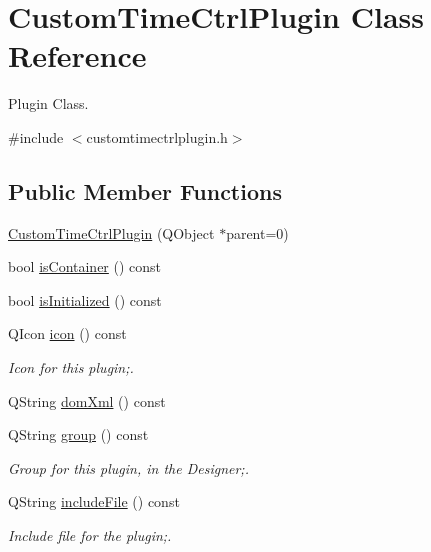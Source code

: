 \hypertarget{class_custom_time_ctrl_plugin}{
\section{CustomTimeCtrlPlugin Class Reference}
\label{class_custom_time_ctrl_plugin}
}


Plugin Class.  




{\ttfamily \#include $<$customtimectrlplugin.h$>$}

\subsection*{Public Member Functions}
\begin{DoxyCompactItemize}
\item 
\hyperlink{class_custom_time_ctrl_plugin_abe7cd3182b486842f7dc7f13a5b4c087}{CustomTimeCtrlPlugin} (QObject $\ast$parent=0)
\item 
bool \hyperlink{class_custom_time_ctrl_plugin_ac3f03f248edec95fb4d8e50596adbcbb}{isContainer} () const 
\item 
bool \hyperlink{class_custom_time_ctrl_plugin_a2064723849d9484c5c84aa7ad901274d}{isInitialized} () const 
\item 
QIcon \hyperlink{class_custom_time_ctrl_plugin_ae0dea4f3f0275ab82f97af2f1cd09e9a}{icon} () const 
\begin{DoxyCompactList}\small\item\em Icon for this plugin;. \item\end{DoxyCompactList}\item 
QString \hyperlink{class_custom_time_ctrl_plugin_a67b84de1996b4765eaaf3bb19ae79a1c}{domXml} () const 
\item 
QString \hyperlink{class_custom_time_ctrl_plugin_a3d53c6dcaf283efd9329d8b248c7d403}{group} () const 
\begin{DoxyCompactList}\small\item\em Group for this plugin, in the Designer;. \item\end{DoxyCompactList}\item 
QString \hyperlink{class_custom_time_ctrl_plugin_a873b662cfddffa85ad084a89091cd587}{includeFile} () const 
\begin{DoxyCompactList}\small\item\em Include file for the plugin;. \item\end{DoxyCompactList}\item 

\end{DoxyCompactItemize}
